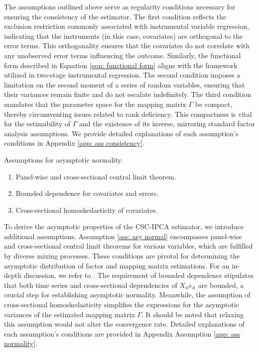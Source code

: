 \documentclass[12pt]{article}
\begin{document}
The assumptions outlined above serve as regularity conditions necessary for ensuring the consistency of the estimator. The first condition reflects the exclusion restriction commonly associated with instrumental variable regression, indicating that the instruments (in this case, covariates) are orthogonal to the error terms. This orthogonality ensures that the covariates do not correlate with any unobserved error terms influencing the outcome. Similarly, the functional form described in Equation \ref{eqn: functional form} aligns with the framework utilized in two-stage instrumental regression. The second condition imposes a limitation on the second moment of a series of random variables, ensuring that their variances remain finite and do not escalate indefinitely. The third condition mandates that the parameter space for the mapping matrix $\Gamma$ be compact, thereby circumventing issues related to rank deficiency. This compactness is vital for the estimability of $\Gamma$ and the existence of its inverse, mirroring standard factor analysis assumptions. We provide detailed explanations of each assumption's conditions in Appendix \ref{app: ass consistency}.

\begin{assumption}
Assumptions for asymptotic normality.
\label{ass: asy normal}
\begin{enumerate}
    \item Panel-wise and cross-sectional central limit theorem.
    \item Bounded dependence for covariates and errors.
    \item Cross-sectional homoskedasticity of covariates.
\end{enumerate}
\end{assumption}

To derive the asymptotic properties of the CSC-IPCA estimator, we introduce additional assumptions. Assumption \ref{ass: asy normal} encompasses panel-wise and cross-sectional central limit theorems for various variables, which are fulfilled by diverse mixing processes. These conditions are pivotal for determining the asymptotic distribution of factor and mapping matrix estimations. For an in-depth discussion, we refer to \cite{kelly2020instrumented}. The requirement of bounded dependence stipulates that both time series and cross-sectional dependencies of $X_{it}\epsilon_{it}$ are bounded, a crucial step for establishing asymptotic normality. Meanwhile, the assumption of cross-sectional homoskedasticity simplifies the expressions for the asymptotic variances of the estimated mapping matrix $\Gamma$. It should be noted that relaxing this assumption would not alter the convergence rate. Detailed explanations of each assumption's conditions are provided in Appendix Assumption \ref{app: ass normality}.
\end{document}

